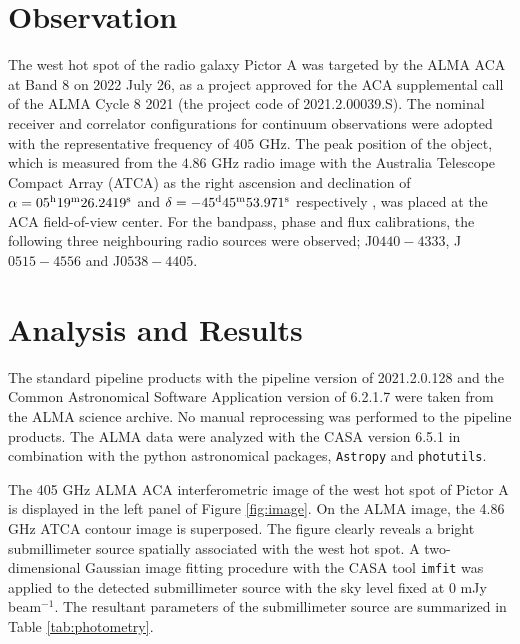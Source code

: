 \documentclass[twocolumn]{aastex631}
\begin{document}
\section{Observation} 
\label{sec:obs}
The west hot spot of the radio galaxy Pictor A was targeted 
by the ALMA ACA at Band 8 on 2022 July 26,
as a project approved for the ACA supplemental call 
of the ALMA Cycle 8 2021 (the project code of 2021.2.00039.S). 
The nominal receiver and correlator configurations 
for continuum observations were adopted 
with the representative frequency of $405$ GHz. 
The peak position of the object, 
which is measured from the $4.86$ GHz radio image 
with the Australia Telescope Compact Array (ATCA)
as the right ascension and declination of 
$\alpha=05^{\rm h}19^{\rm m}26.2419^{\rm s}$ and 
$\delta=-45^{\rm d}45^{\rm m}53.971^{\rm s}$ respectively 
\citep{isobe2017}, was placed at the ACA field-of-view center. 
For the bandpass, phase and flux calibrations, 
the following three neighbouring radio sources were observed; 
J$0440-4333$, J$0515-4556$ and J$0538-4405$.


\section{Analysis and Results} 
\label{sec:results}
The standard pipeline products 
with the pipeline version of 2021.2.0.128 and 
the Common Astronomical Software Application \citep[CASA;][]{mcmullin2007} version of 6.2.1.7
were taken from the ALMA science archive.
No manual reprocessing was performed to the pipeline products.
The ALMA data were analyzed with the CASA version 6.5.1 
in combination with the python astronomical packages, 
{\tt Astropy} \citep{astropy2013,astropy2018,astropy2022} 
and {\tt photutils}. %

The 405 GHz ALMA ACA interferometric image 
of the west hot spot of Pictor A 
is displayed in the left panel of Figure \ref{fig:image}. 
On the ALMA image, the 4.86 GHz ATCA contour image is superposed.
The figure clearly reveals a bright submillimeter source
spatially associated with the west hot spot.
A two-dimensional Gaussian image fitting procedure 
with the CASA tool {\tt imfit} was applied to 
the detected submillimeter source
with the sky level fixed at 0 mJy beam$^{-1}$.
The resultant parameters of the submillimeter source
are summarized in Table \ref{tab:photometry}.
\end{document}
